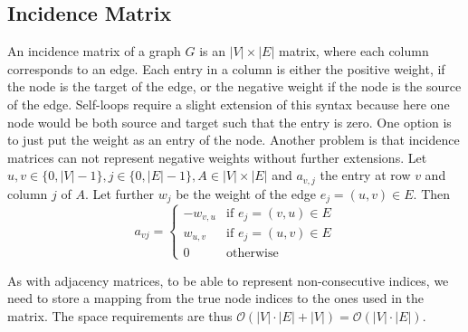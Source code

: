         \subsection*{Incidence Matrix}
            An incidence matrix of a graph $G$ is an $|V| \times |E|$ matrix, where each column corresponds to an edge. 
            Each entry in a column is either the positive weight, if the node is the target of the edge, or the negative weight if the node is the source of the edge. Self-loops require a slight extension of this syntax because here one node would be both source and target such that the entry is zero. One option is to just put the weight as an entry of the node.  Another problem is that incidence matrices can not represent negative weights without further extensions.        
            Let $u,v \in \{0, |V|-1\}, j \in \{0, |E|-1\}, A \in |V| \times |E|$ and $a_{v,j}$ the entry at row $v$ and column $j$ of $A$. Let further $w_j$ be the weight of the edge $e_j = (u,v) \in E$. Then 
            \[         a_{vj} = \begin{cases}
                        -w_{v,u} & \text{if } e_j = (v,u) \in E \\
                        w_{u,v} & \text{if } e_j = (u,v) \in E \\
                        0 & \text{otherwise}
                        \end{cases}
            \]
            
            As with adjacency matrices, to be able to represent non-consecutive indices, we need to store a mapping from the true node indices to the ones used in the matrix.
            The space requirements are thus $\mathcal{O}(|V| \cdot |E| + |V|) = \mathcal{O}(|V| \cdot |E|)$.
            
